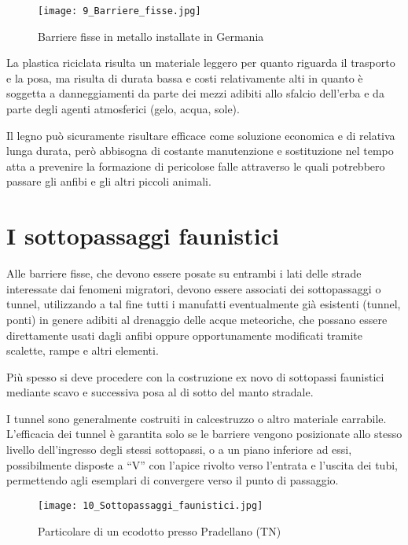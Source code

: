 \documentclass[11pt,a4paper,twoside]{memoir}
\begin{document}
\begin{figure}[H]
\label{fig:barr_fixmetal}
\centering
  \texttt{[image: 9\_Barriere\_fisse.jpg]}
\caption{Barriere fisse in metallo installate in Germania}
\end{figure}

La plastica riciclata risulta un materiale leggero per quanto riguarda il trasporto e la posa, ma risulta di durata bassa e costi relativamente alti in quanto è soggetta a danneggiamenti da parte dei mezzi adibiti allo sfalcio dell’erba e da parte degli agenti atmosferici (gelo, acqua, sole).

Il legno può sicuramente risultare efficace come soluzione economica e di relativa lunga durata, però abbisogna di costante manutenzione e sostituzione nel tempo atta a prevenire la formazione di pericolose falle attraverso le quali potrebbero passare gli anfibi e gli altri piccoli animali.

\section{I sottopassaggi faunistici}
Alle barriere fisse, che devono essere posate su entrambi i lati delle strade interessate dai fenomeni migratori, devono essere associati dei sottopassaggi o tunnel, utilizzando a tal fine tutti i manufatti eventualmente già esistenti (tunnel, ponti) in genere adibiti al drenaggio delle acque meteoriche, che possano essere direttamente usati dagli anfibi oppure opportunamente modificati tramite scalette, rampe e altri elementi.

Più spesso si deve procedere con la costruzione ex novo di sottopassi faunistici mediante scavo e successiva posa al di sotto del manto stradale.

I tunnel sono generalmente costruiti in calcestruzzo o altro materiale carrabile. L’efficacia dei tunnel è garantita solo se le barriere vengono posizionate allo stesso livello dell’ingresso degli stessi sottopassi, o a un piano inferiore ad essi, possibilmente disposte a “V” con l’apice rivolto verso l'entrata e l'uscita dei tubi, permettendo agli esemplari di convergere verso il punto di passaggio.

\begin{figure}[H]
\label{fig:sottopass}
\centering
  \texttt{[image: 10\_Sottopassaggi\_faunistici.jpg]}
\caption{Particolare di un ecodotto presso Pradellano (TN)}
\end{figure}
\end{document}
